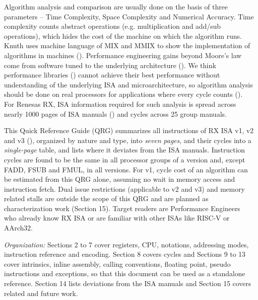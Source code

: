 \SOPNoteBody

Algorithm analysis and comparison are usually done on the basis of three parameters -- Time Complexity, 
Space Complexity and Numerical Accuracy. Time complexity counts abstract operations (e.g. multiplication and 
add/sub operations), which hides the cost of the machine on which the algorithm runs. Knuth uses machine 
language of MIX and MMIX to show the implementation of algorithms in machines (\cite{knuth_mmix}). Performance 
engineering gains beyond Moore's law come from software tuned to the underlying architecture (\cite{charles_pe_paper}). 
We think performance libraries (\cite{rx_dsplib, cmsis_dsplib, esp_dsp_lib}) cannot achieve their 
best performance without understanding of the underlying ISA and microarchitecture, so algorithm analysis 
should be done on real processors for applications where every cycle counts (\cite{lex_ffmpeg}). For Renesas 
RX, ISA information required for such analysis is spread across nearly 1000 pages of ISA manuals 
(\cite{rx_v1_um, rx_v2_um, rx_v3_um}) and cycles across 25 group manuals.

This Quick Reference Guide (QRG) summarizes all instructions of RX ISA v1, v2 and v3
(), organized by nature and type, into \emph{seven pages},
and their cycles into a \emph{single-page} table, and lists where it deviates from the ISA manuals.
Instruction cycles are found to be the same in all processor groups of a version and, except FADD, FSUB
and FMUL, in all versions. For v1, cycle cost of an algorithm can be estimated from this QRG alone,
assuming no wait in memory access and instruction fetch. Dual issue restrictions (applicable to v2 and 
v3) and memory related stalls are outside the scope of this QRG and are planned as characterization work 
(Section 15). Target readers are Performance Engineers who already know RX ISA or are familiar with other 
ISAs like RISC-V or AArch32.

\emph{Organization:} %
Sections 2 to 7 cover registers, CPU, notations, addressing modes, instruction reference and encoding.
Section 8 covers cycles and Sections 9 to 13 cover intrinsics, inline assembly, calling conventions, floating
point, pseudo instructions and exceptions, so that this document can be used as a standalone reference.
Section 14 lists deviations from the ISA manuals and Section 15 covers related and future work.





